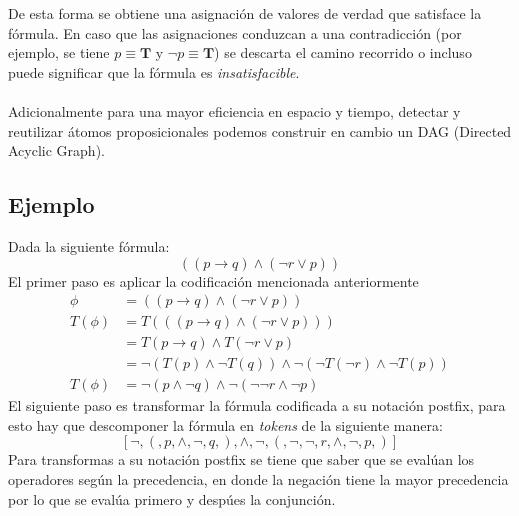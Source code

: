 \documentclass{report}
\begin{document}
	De esta forma se obtiene una asignaci\'on de valores de verdad que satisface la f\'ormula. En caso que las asignaciones conduzcan a una contradicci\'on (por ejemplo, se tiene $p \equiv \textbf{T}$ y $\neg p\equiv \textbf{T}$) se descarta el camino recorrido o incluso puede significar que la f\'ormula es \textit{insatisfacible}. \\\\
	Adicionalmente para una mayor eficiencia en espacio y tiempo, detectar y reutilizar \'atomos proposicionales podemos construir en cambio un DAG (Directed Acyclic Graph).
	\subsection{Ejemplo}
	Dada la siguiente f\'ormula:
	\[ ((p \rightarrow q) \wedge (\neg r \vee p)) \]
	El primer paso es aplicar la codificaci\'on mencionada anteriormente
	\begin{align*}
		\phi &= ((p \rightarrow q) \wedge (\neg r \vee p)) \\
		T(\phi) &= T(((p \rightarrow q) \wedge (\neg r \vee p)) ) \\
		&= T(p \rightarrow q) \wedge T(\neg r \vee p) \\
		&= \neg(T(p) \wedge \neg T(q)) \wedge \neg(\neg T(\neg r) \wedge \neg T(p)) \\
		T(\phi) &= \neg(p \wedge \neg q) \wedge \neg(\neg \neg r \wedge \neg p)
	\end{align*}
	El siguiente paso es transformar la f\'ormula codificada a su notaci\'on postfix, para esto hay que descomponer la f\'ormula en \textit{tokens} de la siguiente manera:
	\[ [\neg, (, p, \wedge, \neg, q, ), \wedge, \neg, (, \neg, \neg, r, \wedge, \neg, p, )] \]
	Para transformas a su notaci\'on postfix se tiene que saber que se eval\'uan los operadores seg\'un la precedencia, en donde la negaci\'on tiene la mayor precedencia por lo que se eval\'ua primero y desp\'ues la conjunci\'on.
\end{document}
